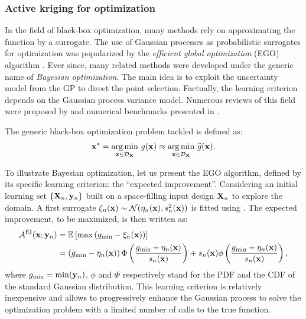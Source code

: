 \subsubsection{Active kriging for optimization}

In the field of black-box optimization, many methods rely on approximating the function by a surrogate. 
The use of Gaussian processes as probabilistic surrogates for optimization was popularized by the \textit{efficient global optimization} (EGO) algorithm \citep{jones_1998}. 
Ever since, many related methods were developed under the generic name of \textit{Bayesian optimization}. 
The main idea is to exploit the uncertainty model from the GP to direct the point selection. 
Factually, the learning criterion depends on the Gaussian process variance model.  
Numerous reviews of this field were proposed by \citet{shahriari_2015,gramacy_2020_book} and numerical benchmarks presented in \citet{leriche_2021}.

The generic black-box optimization problem tackled is defined as:
\begin{equation}
    {\bf x}^* = \operatorname*{arg\,min}_{{\bf x} \in \mathcal{D}_{{\bf X}}} \, g({\bf x}) \approx \operatorname*{arg\,min}_{{\bf x} \in \mathcal{D}_{{\bf X}}} \, \widehat{g}({\bf x}).
\end{equation}

To illustrate Bayesian optimization, let us present the EGO algorithm, defined by its specific learning criterion: the ``expected improvement''. 
Considering an initial learning set $\left\{{\bf X}_n, {\bf y}_n\right\}$ built on a space-filling input design ${\bf X}_n$ to explore the domain. 
A first surrogate $\xi_n({\bf x}) \sim \mathcal{N}(\eta_n({\bf x}), s_n^2({\bf x}))$ is fitted using . 
The expected improvement, to be maximized, is then written as: 
\begin{align}
    \mathcal{A}^{\textrm{EI}}({\bf x}; {\bf y}_n) &= \mathbb{E}\left[\max\left(g_{\min} - \xi_n({\bf x})\right)\right] \\ 
                                  &=\left(g_{\min} - \eta_n({\bf x})\right) \Phi\left( \frac{g_{\min} - \eta_n({\bf x})}{s_n({\bf x})}\right) + 
                                    s_n({\bf x}) \phi\left(\frac{g_{\min} - \eta_n({\bf x})}{s_n({\bf x})}\right),
    \label{eq:exp_improvement}
\end{align}
where $g_{\min} = \min({\bf y}_n)$, $\phi$ and $\Phi$ respectively stand for the PDF and the CDF of the standard Gaussian distribution.
This learning criterion is relatively inexpensive and allows to progressively enhance the Gaussian process to solve the optimization problem with a limited number of calls to the true function. 

